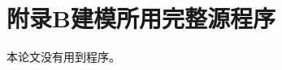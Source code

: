 \documentclass[UTF8,a4paper,12pt,zihao=-4]{ctexart}
\newcommand{\TemplateField}[1]{\textbf{【#1】}}
\newif\ifusedprogram
\newcommand{\includecode}[3]{%
  \IfFileExists{#3}{%
  }{%
    \par\noindent
    \fbox{%
      \begin{minipage}{0.94\linewidth}
        \textbf{代码缺失：}\texttt{\detokenize{#3}}。正式提交前必须补齐完整、可运行且与论文结果一致的源程序。
      \end{minipage}%
    }
    \par
  }%
}
\begin{document}
\clearpage
\section*{附录B\quad 建模所用完整源程序}
\ifusedprogram
\subsection*{B.1\quad 问题一源程序}
本程序用于\TemplateField{说明所解决的子问题以及与正文公式、图表和结果的对应关系}。
\includecode{Python}{问题一完整源程序}{../03-models/q1.py}

\subsection*{B.2\quad 问题二源程序}
本程序用于\TemplateField{说明所解决的子问题以及与正文公式、图表和结果的对应关系}。
\includecode{Python}{问题二完整源程序}{../03-models/q2.py}

\else
本论文没有用到程序。
\fi
\end{document}
